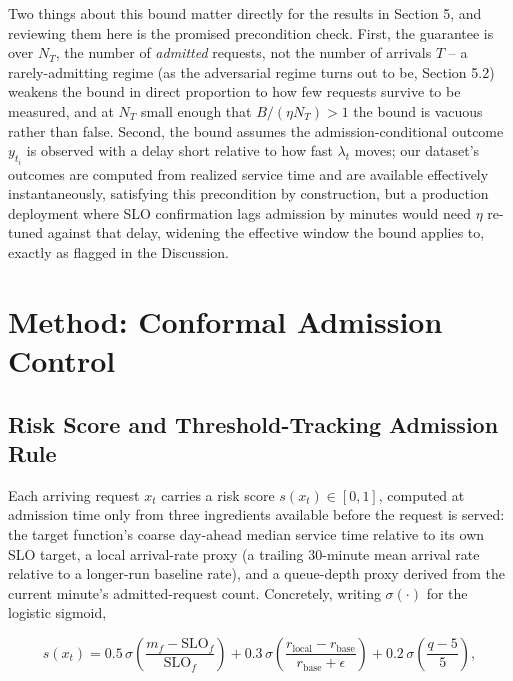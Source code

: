 \documentclass[11pt,letterpaper]{article}
\begin{document}
Two things about this bound matter directly for the results in Section 5, and reviewing them here is the promised precondition check. First, the guarantee is over $N_T$, the number of \textit{admitted} requests, not the number of arrivals $T$ -- a rarely-admitting regime (as the adversarial regime turns out to be, Section 5.2) weakens the bound in direct proportion to how few requests survive to be measured, and at $N_T$ small enough that $B/(\eta N_T) > 1$ the bound is vacuous rather than false. Second, the bound assumes the admission-conditional outcome $y_{t_i}$ is observed with a delay short relative to how fast $\lambda_t$ moves; our dataset's outcomes are computed from realized service time and are available effectively instantaneously, satisfying this precondition by construction, but a production deployment where SLO confirmation lags admission by minutes would need $\eta$ re-tuned against that delay, widening the effective window the bound applies to, exactly as flagged in the Discussion.

\section{Method: Conformal Admission Control}

\subsection{Risk Score and Threshold-Tracking Admission Rule}

Each arriving request $x_t$ carries a risk score $s(x_t) \in [0,1]$, computed at admission time only from three ingredients available before the request is served: the target function's coarse day-ahead median service time relative to its own SLO target, a local arrival-rate proxy (a trailing 30-minute mean arrival rate relative to a longer-run baseline rate), and a queue-depth proxy derived from the current minute's admitted-request count. Concretely, writing $\sigma(\cdot)$ for the logistic sigmoid,

$$s(x_t) = 0.5 \, \sigma\!\left(\frac{m_f - \mathrm{SLO}_f}{\mathrm{SLO}_f}\right) + 0.3 \, \sigma\!\left(\frac{r_{\text{local}} - r_{\text{base}}}{r_{\text{base}} + \epsilon}\right) + 0.2 \, \sigma\!\left(\frac{q - 5}{5}\right),$$
\end{document}
